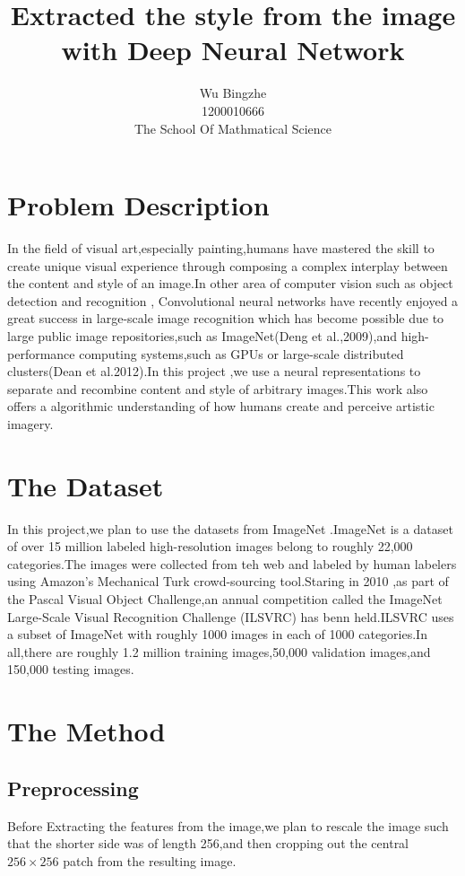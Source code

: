 \documentclass[10pt,a4paper]{article}
\author{Wu Bingzhe\\1200010666\\The School Of Mathmatical Science}
\title{Extracted the style from the image\\with Deep Neural Network}
\begin{document}
	\maketitle
	\section{Problem Description}
	In the field of visual art,especially painting,humans have mastered the 
	skill to create unique visual experience through composing a complex interplay
	between the content and style of an image.In other area of computer vision such as object detection and recognition , Convolutional neural networks 
	have recently enjoyed a great success in large-scale image recognition\cite{Krizhevsky2012ImageNet} which has become possible due to large public image repositories,such as ImageNet(Deng et al.,2009),and high-performance computing systems,such as GPUs
	or large-scale distributed clusters\cite{Deng2012Large}(Dean et al.2012).In this project ,we use 
	a neural representations to separate and recombine content and style of arbitrary images.This work also offers a algorithmic understanding of how
	humans create and perceive artistic imagery.
	\section{The Dataset}
	In this project,we plan to use the datasets from ImageNet .ImageNet is a dataset of over 15 million labeled high-resolution images belong to roughly 22,000 categories.The images were collected from teh web and labeled by human labelers using Amazon's Mechanical Turk crowd-sourcing tool.Staring in 2010 ,as part of the Pascal Visual Object Challenge,an annual competition called the ImageNet Large-Scale Visual Recognition Challenge (ILSVRC) has benn held.ILSVRC uses a subset of ImageNet with roughly 1000
	images in each of 1000 categories.In all,there are roughly 1.2 million training images,50,000 validation images,and 150,000 testing images.
	\section{The Method}
	\subsection{ Preprocessing}
	Before Extracting the features from the image,we plan to rescale 
	the image such that the shorter side was of length 256,and then cropping out the central $256\times 256$ patch from the resulting image.
\end{document}
